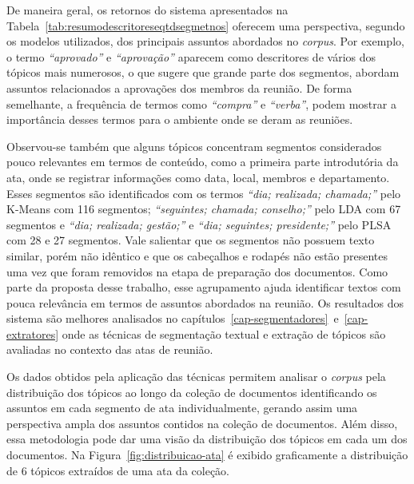 
\begin{landscape}%

\end{landscape}




De maneira geral, os retornos do sistema apresentados na Tabela~\ref{tab:resumodescritoreseqtdsegmetnos} oferecem uma perspectiva, segundo os modelos utilizados, dos principais assuntos abordados no \textit{corpus}. Por exemplo, o termo \textit{``aprovado''} e \textit{``aprovação''} aparecem como descritores de vários dos tópicos mais numerosos, o que sugere que grande parte dos segmentos, abordam assuntos relacionados a aprovações dos membros da reunião. De forma semelhante, a frequência de termos como \textit{``compra''} e \textit{``verba''}, podem mostrar a importância desses termos para o ambiente onde se deram as reuniões.


Observou-se também que alguns tópicos concentram segmentos considerados pouco relevantes em termos de conteúdo, como a primeira parte introdutória da ata, onde se registrar informações como data, local, membros e departamento. Esses segmentos são identificados com os termos 
\textit{``dia; realizada; chamada;''} pelo K-Means com 116 segmentos; 
\textit{``seguintes; chamada; conselho;''} pelo LDA com 67 segmentos e 
\textit{``dia; realizada; gestão;''} e \textit{``dia; seguintes; presidente;''} pelo PLSA com 28 e 27 segmentos. Vale salientar que os segmentos não possuem texto similar, porém não idêntico e que os cabeçalhos e rodapés não estão presentes uma vez que foram removidos na etapa de preparação dos documentos. Como parte da proposta desse trabalho, esse agrupamento ajuda identificar textos com pouca relevância em termos de assuntos abordados na reunião.
Os resultados dos sistema são melhores analisados no capítulos~\ref{cap-segmentadores}~e~\ref{cap-extratores} onde as técnicas de segmentação textual e extração de tópicos são avaliadas no contexto das atas de reunião.


Os dados obtidos pela aplicação das técnicas permitem analisar o \textit{corpus} pela distribuição dos tópicos ao longo da coleção de documentos identificando os assuntos em cada segmento de ata individualmente, gerando assim uma perspectiva ampla dos assuntos contidos na coleção de documentos. Além disso, essa metodologia pode dar uma visão da distribuição dos tópicos em cada um dos documentos. Na Figura~\ref{fig:distribuicao-ata} é exibido graficamente a distribuição de 6 tópicos extraídos de uma ata da coleção. 


